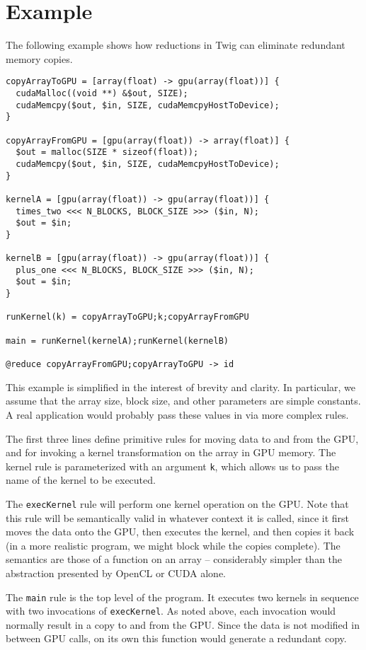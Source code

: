 
\section{Example}

The following example shows how reductions in Twig can eliminate redundant
memory copies.

\begin{verbatim}
copyArrayToGPU = [array(float) -> gpu(array(float))] {
  cudaMalloc((void **) &$out, SIZE);
  cudaMemcpy($out, $in, SIZE, cudaMemcpyHostToDevice);
}

copyArrayFromGPU = [gpu(array(float)) -> array(float)] {
  $out = malloc(SIZE * sizeof(float));
  cudaMemcpy($out, $in, SIZE, cudaMemcpyHostToDevice);
}

kernelA = [gpu(array(float)) -> gpu(array(float))] {
  times_two <<< N_BLOCKS, BLOCK_SIZE >>> ($in, N);
  $out = $in;
}

kernelB = [gpu(array(float)) -> gpu(array(float))] {
  plus_one <<< N_BLOCKS, BLOCK_SIZE >>> ($in, N);
  $out = $in;
}

runKernel(k) = copyArrayToGPU;k;copyArrayFromGPU

main = runKernel(kernelA);runKernel(kernelB)

@reduce copyArrayFromGPU;copyArrayToGPU -> id	
\end{verbatim}

This example is simplified in the interest of brevity and clarity. In
particular, we assume that the array size, block size, and other parameters are
simple constants. A real application would probably pass these values in via
more complex rules.

The first three lines define primitive rules for moving data to and from the
GPU, and for invoking a kernel transformation on the array in GPU memory. The
kernel rule is parameterized with an argument \texttt{k}, which allows us to
pass the name of the kernel to be executed.

The \texttt{execKernel} rule will perform one kernel operation on the GPU. Note
that this rule will be semantically valid in whatever context it is called,
since it first moves the data onto the GPU, then executes the kernel, and then
copies it back (in a more realistic program, we might block while the copies
complete). The semantics are those of a function on an array -- considerably
simpler than the abstraction presented by OpenCL or CUDA alone.

The \texttt{main} rule is the top level of the program. It executes two kernels
in sequence with two invocations of \texttt{execKernel}. As noted above, each
invocation would normally result in a copy to and from the GPU. Since the data
is not modified in between GPU calls, on its own this function would generate a
redundant copy.

